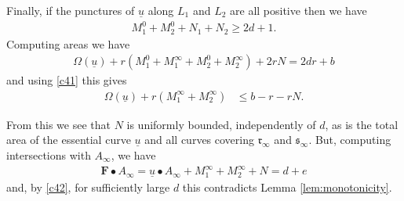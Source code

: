 \documentclass[12pt]{amsart}
\theoremstyle{definition}
\begin{document}
\bigskip

 Finally, if the punctures of $\underline{u}$ along $L_1$ and $L_2$ are all positive then we have 
\begin{align}\label{c41}
M_1^0 + M_2^0 + N_1 + N_2 \ge 2d+1. 
\end{align}
Computing areas we have
\begin{align*}
\Omega(\underline{u}) + r(M_1^0 +M_1^{\infty}+M_2^0 +M_2^{\infty}) + 2rN = 2dr + b
\end{align*}
and using \eqref{c41} this gives
\begin{align}\label{c42}
\Omega(\underline{u}) + r(M_1^{\infty}+ M_2^{\infty})
&\leq  b - r - rN.
\end{align}

From this we see that $N$ is uniformly bounded, independently of $d$, as is the total area of the essential curve $\underline{u}$ and all curves covering $\mathfrak{r}_{\infty}$ and $\mathfrak{s}_{\infty}$.
But, computing intersections with $A_{\infty}$, we have
\begin{align*}
  \mathbf{F} \bullet A_{\infty} = \underline{u} \bullet A_{\infty} + M_1^{\infty} +M_2^{\infty} +N =d+e
\end{align*}
and, by \eqref{c42}, for sufficiently large $d$ this contradicts Lemma \ref{lem:monotonicity}. 






\end{document}
